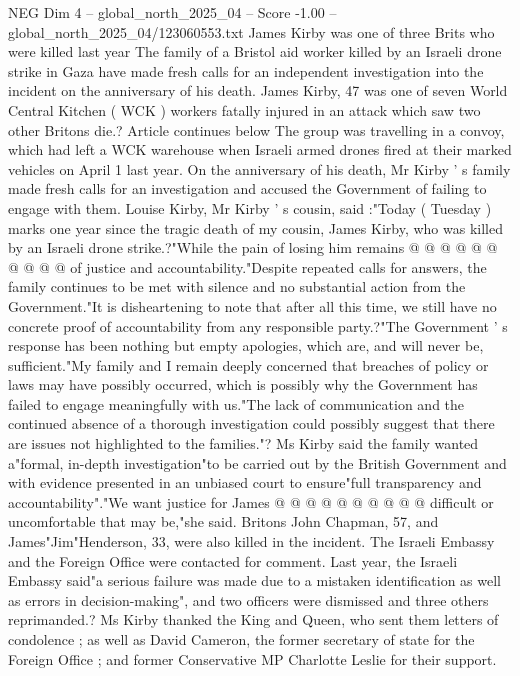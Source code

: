 \begin{textsample}{NEG Dim 4 – global\_north\_2025\_04 – Score -1.00 – global\_north\_2025\_04/123060553.txt}  \label{ex:f4_neg_232}
James Kirby was one of three Brits who were killed last year The family of a Bristol aid worker killed by an Israeli drone strike in Gaza have made fresh calls for an independent investigation into the incident on the anniversary of his death.
James Kirby, 47 was one of seven World Central Kitchen ( WCK ) workers fatally injured in an attack which saw two other Britons die.?
Article continues below The group was travelling in a convoy, which had left a WCK warehouse when Israeli armed drones fired at their marked vehicles on April 1 last year.
On the anniversary of his death, Mr Kirby ' s family made fresh calls for an investigation and accused the Government of failing to engage with them.
Louise Kirby, Mr Kirby ' s cousin, said :"Today ( Tuesday ) marks one year since the tragic death of my cousin, James Kirby, who was killed by an Israeli drone strike.?"While the pain of losing him remains @ @ @ @ @ @ @ @ @ @ of justice and accountability."Despite repeated calls for answers, the family continues to be met with silence and no substantial action from the Government."It is disheartening to note that after all this time, we still have no concrete proof of accountability from any responsible party.?"The Government ' s response has been nothing but empty apologies, which are, and will never be, sufficient."My family and I remain deeply concerned that breaches of policy or laws may have possibly occurred, which is possibly why the Government has failed to engage meaningfully with us."The lack of communication and the continued absence of a thorough investigation could possibly suggest that there are issues not highlighted to the families."?
Ms Kirby said the family wanted a"formal, in-depth investigation"to be carried out by the British Government and with evidence presented in an unbiased court to ensure"full transparency and accountability"."We want justice for James @ @ @ @ @ @ @ @ @ @ difficult or uncomfortable that may be,"she said.
Britons John Chapman, 57, and James"Jim"Henderson, 33, were also killed in the incident.
The Israeli Embassy and the Foreign Office were contacted for comment.
Last year, the Israeli Embassy said"a serious failure was made due to a mistaken identification as well as errors in decision-making", and two officers were dismissed and three others reprimanded.?
Ms Kirby thanked the King and Queen, who sent them letters of condolence ; as well as David Cameron, the former secretary of state for the Foreign Office ; and former Conservative MP Charlotte Leslie for their support.

\end{textsample}
